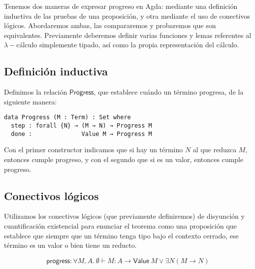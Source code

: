 \documentclass{article}
\newcommand{\stlcw}{$\lambda-$cálculo simplemente tipado\xspace}
\newcommand{\n}[1]{\ensuremath{\mathsf{#1}}}
\begin{document}
Tenemos dos maneras de expresar progreso en Agda: mediante una definición
inductiva de las pruebas de una proposición, y otra mediante el uso de
conectivos lógicos. Abordaremos ambas, las compararemos y probaremos que son
equivalentes. Previamente deberemos definir varias funciones y lemas referentes
al \stlcw, así como la propia representación del cálculo.

\subsection{Definición inductiva}

Definimos la relación \n{Progress}, que establece cuándo un término progresa,
de la siguiente manera:

\verb|data Progress (M : Term) : Set where|\\
\verb|  step : forall {N} → (M → N) → Progress M|\\
\verb|  done :              Value M → Progress M|

Con el primer constructor indicamos que si hay un término $N$ al que
reduzca $M$, entonces cumple progreso, y con el segundo que si es un valor,
entonces cumple progreso.

\subsection{Conectivos lógicos}

Utilizamos los conectivos lógicos (que previamente definiremos) de disyunción y
cuantificación existencial para enunciar el teorema como una proposición que
establece que siempre que un término tenga tipo bajo el contexto cerrado, ese
término es un valor o bien tiene un reducto.

$$\n{progress} :
  \forall M,A.\
    \emptyset \vdash M : A \rightarrow
      \n{Value}\ M \vee \exists N (M \longrightarrow N)$$
\end{document}
